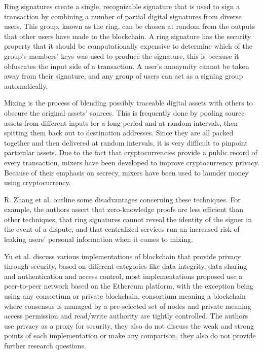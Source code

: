 Ring signatures create a single, recognizable signature that is used to sign
a transaction by combining a number of partial digital signatures from diverse
users. This group, known as the ring, can be chosen at random from the outputs
that other users have made to the blockchain. A ring signature has the security
property that it should be computationally expensive to determine which
of the group's members' keys was used to produce the signature, this is because
it obfuscates the input side of a transaction. A user's anonymity cannot
be taken away from their signature, and any group of users can act as a signing
group automatically.

Mixing is the process of blending possibly traceable digital assets
with others to obscure the original assets' sources. This is frequently done
by pooling source assets from different inputs for a long period and at random
intervals, then spitting them back out to destination addresses. Since they
are all packed together and then delivered at random intervals, it is very
difficult to pinpoint particular assets. Due to the fact that cryptocurrencies
provide a public record of every transaction, mixers have been developed
to improve cryptocurrency privacy. Because of their emphasis on secrecy,
mixers have been used to launder money using cryptocurrency.

R. Zhang et al. \cite{zhang2019security} outline some disadvantages concerning
these techniques. For example, the authors assert that zero-knowledge proofs
are less efficient than other techniques, that ring signatures cannot reveal
the identity of the signer in the event of a dispute, and that centralized
services run an increased risk of leaking users' personal information when
it comes to mixing.

Yu et al. \cite{yu2018blockchain} discuss various implementations of blockchain
that provide privacy through security, based on different categories like
data integrity, data sharing and authentication and access control, most
implementations proposed use a peer-to-peer network based on the Ethereum
platform, with the exception being using any consortium or private blockchain,
consortium meaning a blockchain where consensus is managed by a pre-selected set
of nodes and private meaning access permission and read/write authority are
tightly controlled. The authors use privacy as a proxy for security, they also
do not discuss the weak and strong points of each implementation or make any
comparison, they also do not provide further research questions.

